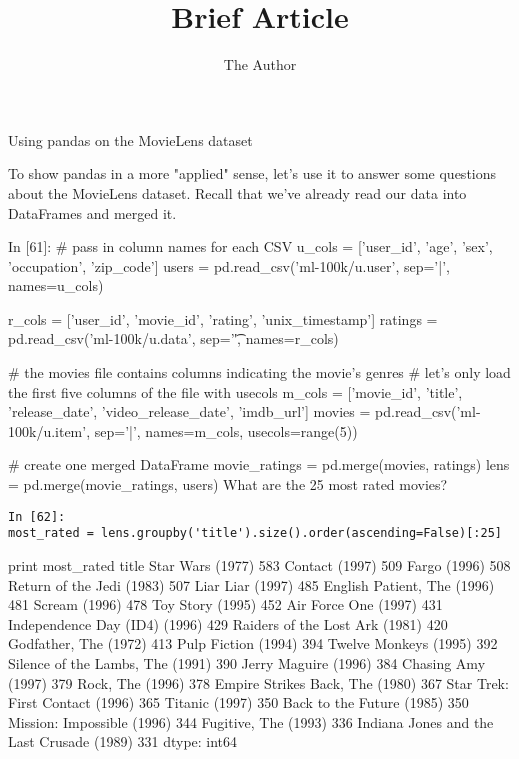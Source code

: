 \documentclass[11pt]{article} %
\title{Brief Article}
\author{The Author}
\begin{document}

Using pandas on the MovieLens dataset

To show pandas in a more "applied" sense, let's use it to answer some questions about the MovieLens dataset. Recall that we've already read our data into DataFrames and merged it.

In [61]:
# pass in column names for each CSV
u_cols = ['user_id', 'age', 'sex', 'occupation', 'zip_code']
users = pd.read_csv('ml-100k/u.user', sep='|', names=u_cols)

r_cols = ['user_id', 'movie_id', 'rating', 'unix_timestamp']
ratings = pd.read_csv('ml-100k/u.data', sep='\t', names=r_cols)

# the movies file contains columns indicating the movie's genres
# let's only load the first five columns of the file with usecols
m_cols = ['movie_id', 'title', 'release_date', 'video_release_date', 'imdb_url']
movies = pd.read_csv('ml-100k/u.item', sep='|', names=m_cols, usecols=range(5))

# create one merged DataFrame
movie_ratings = pd.merge(movies, ratings)
lens = pd.merge(movie_ratings, users)
What are the 25 most rated movies?

\begin{verbatim}
In [62]:
most_rated = lens.groupby('title').size().order(ascending=False)[:25]
\end{verbatim}
print most_rated
title
Star Wars (1977)                             583
Contact (1997)                               509
Fargo (1996)                                 508
Return of the Jedi (1983)                    507
Liar Liar (1997)                             485
English Patient, The (1996)                  481
Scream (1996)                                478
Toy Story (1995)                             452
Air Force One (1997)                         431
Independence Day (ID4) (1996)                429
Raiders of the Lost Ark (1981)               420
Godfather, The (1972)                        413
Pulp Fiction (1994)                          394
Twelve Monkeys (1995)                        392
Silence of the Lambs, The (1991)             390
Jerry Maguire (1996)                         384
Chasing Amy (1997)                           379
Rock, The (1996)                             378
Empire Strikes Back, The (1980)              367
Star Trek: First Contact (1996)              365
Titanic (1997)                               350
Back to the Future (1985)                    350
Mission: Impossible (1996)                   344
Fugitive, The (1993)                         336
Indiana Jones and the Last Crusade (1989)    331
dtype: int64
\end{document}
